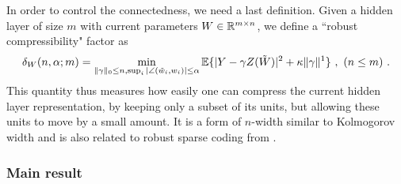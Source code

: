 In order to control the connectedness, we need a last definition. Given a 
hidden layer of size $m$ with current parameters $W \in {\mathbb{R}}^{m \times n}$, we define a
``robust compressibility" factor as 
\begin{equation}
\label{compress}
\delta_W(n, \alpha; m) = \min_{ \|\gamma \|_0 \leq n, \sup_i |\angle(\tilde{w}_i, w_i)| \leq \alpha} {\mathbb{E}} \{| Y - \gamma Z(\tilde{W}) |^2 + \kappa \| \gamma \|^1  \}~,~(n \leq m)~.
\end{equation} 
This quantity thus measures how easily one can compress the current hidden layer representation, 
by keeping only a subset of its units, but allowing these units to move by a small amount. It is a form 
of $n$-width similar to Kolmogorov width \cite{donoho} and is also related to robust sparse coding from \cite{simoncelli_robust}.


\subsubsection{Main result}

